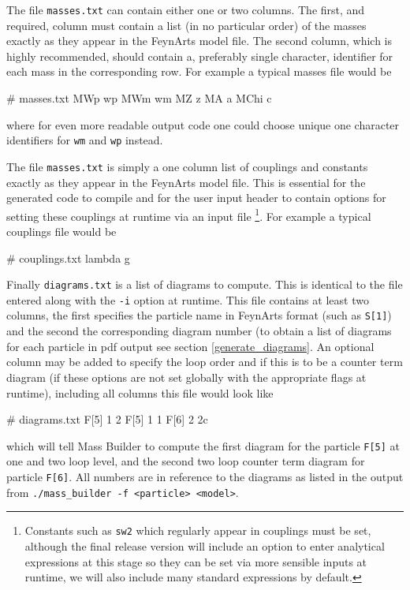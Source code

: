 The file \lstinline{masses.txt} can contain either one or two columns.  The first, and required, column must contain a list (in no particular order) of the masses exactly as they appear in the FeynArts model file.  The second column, which is highly recommended, should contain a, preferably single character, identifier for each mass in the corresponding row.  For example a typical masses file would be
\begin{lstterm}
# masses.txt
MWp          wp
MWm          wm
MZ           z
MA           a
MChi	       c
\end{lstterm}
where for even more readable output code one could choose unique one character identifiers for \lstinline{wm} and \lstinline{wp} instead.

The file \lstinline{masses.txt} is simply a one column list of couplings and constants exactly as they appear in the FeynArts model file.  This is essential for the generated code to compile and for the user input header to contain options for setting these couplings at runtime via an input file \footnote{Constants such as \lstinline{sw2} which regularly appear in couplings must be set, although the final release version will include an option to enter analytical expressions at this stage so they can be set via more sensible inputs at runtime, we will also include many standard expressions by default.}.  For example a typical couplings file would be
\begin{lstterm}
# couplings.txt
lambda
g
\end{lstterm}

Finally \lstinline{diagrams.txt} is a list of diagrams to compute.  This is identical to the file entered along with the \lstinline{-i} option at runtime.  This file contains at least two columns, the first specifies the particle name in FeynArts format (such as \lstinline{S[1]}) and the second the corresponding diagram number (to obtain a list of diagrams for each particle in pdf output see section \ref{generate_diagrams}.  An optional column may be added to specify the loop order and if this is to be a counter term diagram (if these options are not set globally with the appropriate flags at runtime), including all columns this file would look like
\begin{lstterm}
# diagrams.txt
F[5]   1   2
F[5]   1   1
F[6]   2   2c
\end{lstterm}
which will tell Mass Builder to compute the first diagram for the particle \lstinline{F[5]} at one and two loop level, and the second two loop counter term diagram for particle \lstinline{F[6]}.  All numbers are in reference to the diagrams as listed in the output from \lstinline{./mass_builder -f <particle> <model>}.





